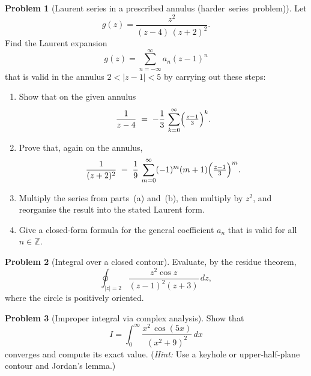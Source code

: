 \documentclass[12pt]{article}
\theoremstyle{definition} %
\newtheorem{problem}{Problem}
\theoremstyle{plain} %
\begin{document}
  \pagebreak
  \begin{problem}[Laurent series in a prescribed annulus (harder series problem)]
  Let  
  \[
    g(z)=\frac{z^{2}}{(z-4)\,(z+2)^{2}}.
  \]
  Find the Laurent expansion  
  \[
    g(z)=\sum_{n=-\infty}^{\infty}a_{n}(z-1)^{n}
  \]
  that is valid in the annulus $2<\lvert z-1\rvert<5$ by carrying out these steps:
  
  \begin{enumerate}[label=(\alph*),itemsep=6pt]
    \item  Show that on the given annulus  
          \[
            \frac{1}{z-4}
            \;=\;
            -\frac{1}{3}\,\sum_{k=0}^{\infty}
            \Bigl(\tfrac{z-1}{3}\Bigr)^{k}.
          \]
  
    \item  Prove that, again on the annulus,  
          \[
            \frac{1}{(z+2)^{2}}
            \;=\;
            \frac{1}{9}\,
            \sum_{m=0}^{\infty}(-1)^{m}(m+1)
            \Bigl(\tfrac{z-1}{3}\Bigr)^{m}.
          \]
  
    \item  Multiply the series from parts (a) and (b), then multiply by $z^{2}$,
           and reorganise the result into the stated Laurent form.
  
    \item  Give a closed‑form formula for the general coefficient $a_{n}$
           that is valid for all $n\in\mathbb{Z}$.
  \end{enumerate}
  \end{problem}
  
  \pagebreak
  \begin{problem}[Integral over a closed contour]
  Evaluate, by the residue theorem,
  \[
    \oint_{\lvert z\rvert=2}
    \frac{z^{2}\cos z}{(z-1)^{2}(z+3)}\,dz,
  \]
  where the circle is positively oriented.
  \end{problem}
  
  \pagebreak
  \begin{problem}[Improper integral via complex analysis]
  Show that
  \[
    I=\int_{0}^{\infty}
    \frac{x^{2}\,\cos(5x)}{(x^{2}+9)^{2}}\,dx
  \]
  converges and compute its exact value.
  (\emph{Hint:}  Use a keyhole or upper‑half‑plane contour and Jordan’s lemma.)
  \end{problem}
  
\end{document}

